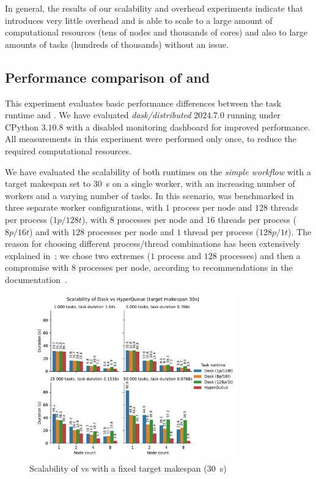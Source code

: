 In general, the results of our scalability and overhead experiments indicate that \hyperqueue{}
introduces very little overhead and is able to scale to a large amount of computational
resources (tens of nodes and thousands of cores) and also to large amounts of tasks
(hundreds of thousands) without an issue.

\subsection{Performance comparison of \dask{} and \hq{}}
\label{sec:hq-exp-dask}
This experiment evaluates basic performance differences between the \dask{} task
runtime and \hyperqueue{}. We have evaluated \emph{dask/distributed}
$2024.7.0$ running under CPython $3.10.8$ with a disabled monitoring
dashboard for improved performance. All measurements in this experiment were performed only once,
to reduce the required computational resources.

We have evaluated the scalability of both runtimes on the \emph{simple workflow} with a target
makespan set to \SI{30}{\second} on a single worker, with an increasing number of workers
and a varying number of tasks. In this scenario, \dask{} was benchmarked in three
separate worker configurations, with $1$ process per node and
$128$ threads per process ($1p/128t$), with $8$
processes per node and $16$ threads per process ($8p/16t$) and
with $128$ processes per node and $1$ thread per process
($128p/1t$). The reason for choosing different process/thread combinations has been
extensively explained in~; we chose two extremes ($1$
process and $128$ processes) and then a compromise with $8$
processes per node, according to recommendations in the \dask{}
documentation~\cite{dask-thread-recommendation}.

\begin{figure}[h]
	\centering
	\includegraphics[width=0.8\textwidth]{imgs/hq/charts/dask-vs-hq-sleep}
	\caption{Scalability of \hyperqueue{} vs \dask{} with a fixed target makespan
	(\SI{30}{\second})}
	\label{fig:hq-dask-sleep}
\end{figure}

